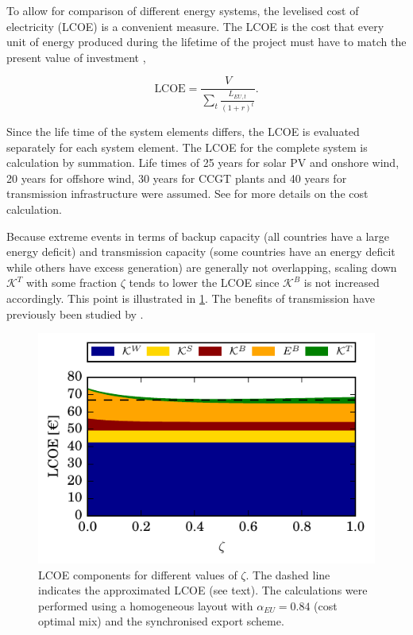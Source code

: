 \documentclass[a4paper, 5p, sort&compress]{elsarticle}%
\newcommand{\paren}[1]{\left(#1\right)}
\begin{document}
To allow for comparison of different energy systems, the levelised
cost of electricity (LCOE) is a convenient measure. The LCOE is the
cost that every unit of energy produced during the lifetime of the
project must have to match the present value of investment
\cite{Short1995},

\begin{equation}
  \label{eq:7}
  \text{LCOE} = \frac{V}{\sum_{t} \frac{L_{EU,
        t}}{\paren{1+r}^{t}}} .
\end{equation}

Since the life time of the system elements differs, the LCOE is
evaluated separately for each system element. The LCOE for the
complete system is calculation by summation. Life times of 25 years
for solar PV and onshore wind, 20 years for offshore wind, 30 years
for CCGT plants and 40 years for transmission infrastructure were
assumed. See \cite{Sensitivity} for more details on the cost
calculation.

Because extreme events in terms of backup capacity (all countries have
a large energy deficit) and transmission capacity (some countries have
an energy deficit while others have excess generation) are generally
not overlapping, scaling down $\mathcal{K}^{T}$ with some fraction
$\zeta$ tends to lower the LCOE since $\mathcal{K}^{B}$ is not increased
accordingly. This point is illustrated in
\cref{fig:transmission-lcoe}. The benefits of transmission have
previously been studied by \cite{Rodriguez2013}.

\begin{figure}[h!]
  \centering
  \includegraphics[width = \columnwidth]{constrainedSync-new}
  \caption{LCOE components for different values of $\zeta$. The dashed
    line indicates the approximated LCOE (see text). The calculations
    were performed using a homogeneous layout with
    $\alpha_{EU} = 0.84$ (cost optimal mix) and the synchronised export
    scheme.}
  \label{fig:transmission-lcoe}
\end{figure}
\end{document}
